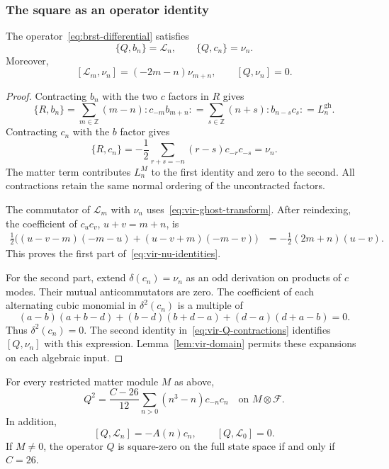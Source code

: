 \subsubsection{The square as an operator identity}

\begin{lemma}\label{lem:vir-Q-contractions}
The operator~\eqref{eq:brst-differential} satisfies
\begin{equation}\label{eq:vir-Q-contractions}
 \{Q,b_n\}=\mathcal L_n,\qquad \{Q,c_n\}=\nu_n.
\end{equation}
Moreover,
\begin{equation}\label{eq:vir-nu-identities}
 [\mathcal L_m,\nu_n]=(-2m-n)\nu_{m+n},\qquad
 [Q,\nu_n]=0.
\end{equation}
\end{lemma}

\begin{proof}
Contracting $b_n$ with the two $c$ factors in $R$ gives
\[
 \{R,b_n\}=\sum_{m\in\mathbb Z}(m-n):c_{-m}b_{m+n}:
 =\sum_{s\in\mathbb Z}(n+s):b_{n-s}c_s:
 =L_n^{\mathrm{gh}}.
\]
Contracting $c_n$ with the $b$ factor gives
\[
 \{R,c_n\}=-\frac12\sum_{r+s=-n}(r-s)c_{-r}c_{-s}=\nu_n.
\]
The matter term contributes $L_n^M$ to the first identity and zero to the second.
All contractions retain the same normal ordering of the uncontracted factors.

The commutator of $\mathcal L_m$ with $\nu_n$ uses~\eqref{eq:vir-ghost-transform}.
After reindexing, the coefficient of $c_uc_v$, $u+v=m+n$, is
\begin{align*}
 \frac12\bigl((u-v-m)(-m-u)+(u-v+m)(-m-v)\bigr)
 &=-\frac12(2m+n)(u-v).
\end{align*}
This proves the first part of~\eqref{eq:vir-nu-identities}.

For the second part, extend $\delta(c_n)=\nu_n$ as an odd derivation on products of $c$ modes.
Their mutual anticommutators are zero.
The coefficient of each alternating cubic monomial in $\delta^2(c_n)$ is a multiple of
\[
 (a-b)(a+b-d)+(b-d)(b+d-a)+(d-a)(d+a-b)=0.
\]
Thus $\delta^2(c_n)=0$.
The second identity in~\eqref{eq:vir-Q-contractions} identifies $[Q,\nu_n]$ with this expression.
Lemma~\ref{lem:vir-domain} permits these expansions on each algebraic input.
\end{proof}

\begin{theorem}\label{thm:vir-square}\label{lem:brst-nilpotence}
For every restricted matter module $M$ as above,
\begin{equation}\label{eq:vir-square}
 \boxed{\displaystyle
 Q^2=\frac{C-26}{12}\sum_{n>0}(n^3-n)c_{-n}c_n
 \quad\text{on }M\otimes\mathcal F.}
\end{equation}
In addition,
\begin{equation}\label{eq:vir-Q-L}
 [Q,\mathcal L_n]=-A(n)c_n,\qquad [Q,\mathcal L_0]=0.
\end{equation}
If $M\neq0$, the operator $Q$ is square-zero on the full state space if and only if $C=26$.
\end{theorem}

